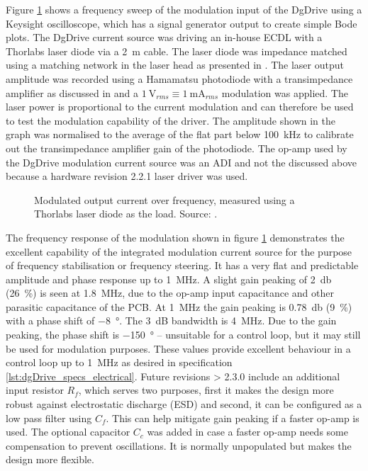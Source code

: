 Figure \ref{fig:dgDrive_modulation_amplitude} shows a frequency sweep of the modulation input of the DgDrive using a Keysight  oscilloscope, which has a signal generator output to create simple Bode plots. The DgDrive current source was driving an in-house ECDL with a Thorlabs  laser diode via a \qty{2}{\m} cable. The laser diode was impedance matched using a matching network in the laser head as presented in \cite{current_mod_paper}. The laser output amplitude was recorded using a Hamamatsu  \cite{datasheet_photodiode} photodiode with a transimpedance amplifier as discussed in \cite{thesis_tilman} and a $\qty{1}{\V_{rms}} \equiv \qty{1}{\mA_{rms}}$ modulation was applied. The laser power is proportional to the current modulation \cite{diodelaser_modulation} and can therefore be used to test the modulation capability of the driver. The amplitude shown in the graph was normalised to the average of the flat part below \qty{100}{\kHz} to calibrate out the transimpedance amplifier gain of the photodiode. The op-amp used by the DgDrive modulation current source was an ADI  and not the  discussed above because a hardware revision 2.2.1 laser driver was used.
\begin{figure}[ht]
    \centering
    
    \caption{Modulated output current over frequency, measured using a Thorlabs  laser diode as the load. Source: \cite{thesis_tilman}.}
    \label{fig:dgDrive_modulation_amplitude}
\end{figure}

The frequency response of the modulation shown in figure \ref{fig:dgDrive_modulation_amplitude} demonstrates the excellent capability of the integrated modulation current source for the purpose of frequency stabilisation or frequency steering. It has a very flat and predictable amplitude and phase response up to \qty{1}{\MHz}. A slight gain peaking of \qty{2}{\decibel} (\qty{26}{\percent}) is seen at \qty{1.8}{\MHz}, due to the op-amp input capacitance and other parasitic capacitance of the PCB. At \qty{1}{\MHz} the gain peaking is \qty{0.78}{\decibel} (\qty{9}{\percent}) with a phase shift of \qty{-8}{\degree}. The \qty{3}{\dB} bandwidth is \qty{4}{\MHz}. Due to the gain peaking, the phase shift is \qty{-150}{\degree} -- unsuitable for a control loop, but it may still be used for modulation purposes. These values provide excellent behaviour in a control loop up to \qty{1}{\MHz} as desired in specification \ref{lst:dgDrive_specs_electrical}. Future revisions > 2.3.0 include an additional input resistor $R_f$, which serves two purposes, first it makes the design more robust against electrostatic discharge (ESD) and second, it can be configured as a low pass filter using $C_f$. This can help mitigate gain peaking if a faster op-amp is used. The optional capacitor $C_c$ was added in case a faster op-amp needs some compensation to prevent oscillations. It is normally unpopulated but makes the design more flexible.

